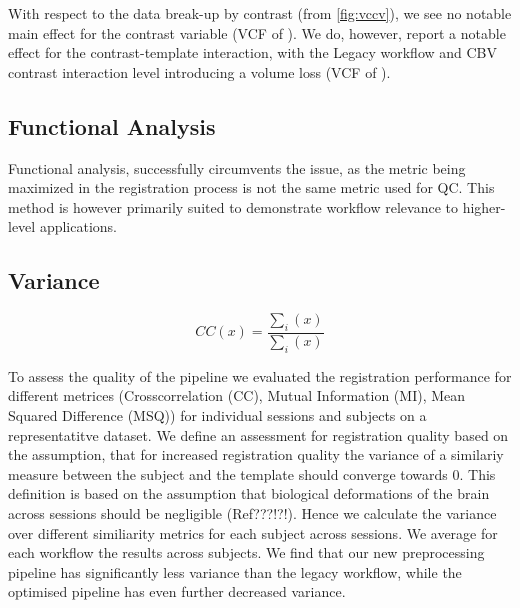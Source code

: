 With respect to the data break-up by contrast (from \cref{fig:vccv}), we see no notable main effect for the contrast variable
(VCF of ).
We do, however, report a notable effect for the contrast-template interaction, with the Legacy workflow and CBV contrast interaction level introducing a volume loss
(VCF of ).

\subsection{Functional Analysis}

Functional analysis, successfully circumvents the issue, as the metric being maximized in the registration process is not the same metric used for QC.
This method is however primarily suited to demonstrate workflow relevance to higher-level applications.

\subsection{Variance}

\[ CC(x) = \frac{\sum_i{(x)}}{\sum_i{(x)}} \]


To assess the quality of the pipeline we evaluated the registration performance for different metrices (Crosscorrelation (CC), Mutual Information (MI), Mean Squared Difference (MSQ)) for individual sessions and subjects on a representatitve dataset.  We define an assessment for registration quality based on the assumption, that for increased registration quality the variance of a similariy measure between the subject and the template should converge towards 0. This definition is based on the assumption that biological deformations of the brain across sessions should be negligible (Ref???!?!). Hence we calculate the variance over different similiarity metrics for each subject across sessions. We average for each workflow the results across subjects. We find that our new preprocessing pipeline has significantly less variance than the legacy workflow, while the optimised pipeline has even further decreased variance.
